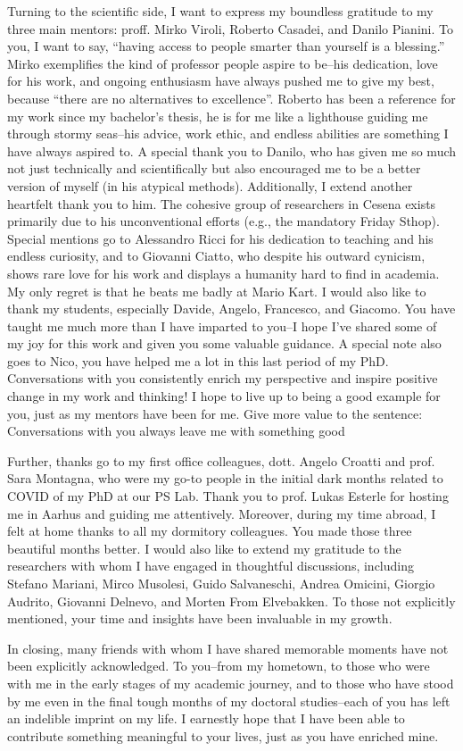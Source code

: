 Turning to the scientific side, 
 I want to express my boundless gratitude to my three main mentors: proff. Mirko Viroli, Roberto Casadei, and Danilo Pianini. 
 To you, I want to say, ``having access to people smarter than yourself is a blessing.'' 
% 
Mirko exemplifies the kind of professor people aspire to be--his dedication, love for his work, 
 and ongoing enthusiasm have always pushed me to give my best, because ``there are no alternatives to excellence''. 
 Roberto has been a reference for my work since my bachelor's thesis, 
 he is for me like a lighthouse guiding me through stormy seas--his advice, work ethic, and endless abilities are something I have always aspired to. 
 A special thank you to Danilo, 
 who has given me so much not just technically and scientifically 
 but also encouraged me to be a better version of myself (in his atypical methods).
 Additionally, I extend another heartfelt thank you to him. The cohesive group of researchers in Cesena exists primarily due to his unconventional efforts (e.g., the mandatory Friday Sthop).
%
Special mentions go to Alessandro Ricci for his dedication to teaching and his endless curiosity, 
 and to Giovanni Ciatto, who despite his outward cynicism, shows rare love for his work and displays a humanity hard to find in academia. 
 My only regret is that he beats me badly at Mario Kart.
%
I would also like to thank my students, especially Davide, Angelo, Francesco, and Giacomo. 
 You have taught me much more than I have imparted to you--I hope I've shared some of my joy for this work and given you some valuable guidance.
%
A special note also goes to Nico, you have helped me a lot in this last period of my PhD.
Conversations with you consistently enrich my perspective and inspire positive change in my work and thinking! 
I hope to live up to being a good example for you, just as my mentors have been for me.
Give more value to the sentence: Conversations with you always leave me with something good

Further, thanks go to my first office colleagues, dott. Angelo Croatti and prof. Sara Montagna, who were my go-to people in the initial dark months related to COVID of my PhD at our PS Lab.
%
Thank you to prof. Lukas Esterle for hosting me in Aarhus and guiding me attentively. 
Moreover, during my time abroad, I felt at home thanks to all my dormitory colleagues. 
You made those three beautiful months better.
%
I would also like to extend my gratitude to the researchers with whom I have engaged in thoughtful discussions, including Stefano Mariani, Mirco Musolesi, Guido Salvaneschi, Andrea Omicini, Giorgio Audrito, Giovanni Delnevo, and Morten From Elvebakken. To those not explicitly mentioned, your time and insights have been invaluable in my growth.

In closing, 
 many friends with whom I have shared memorable moments have not been explicitly acknowledged. 
 To you--from my hometown, to those who were with me in the early stages of my academic journey, and to those who have stood by me even in the final tough months of my doctoral studies--each of you has left an indelible imprint on my life. 
 I earnestly hope that I have been able to contribute something meaningful to your lives, just as you have enriched mine.